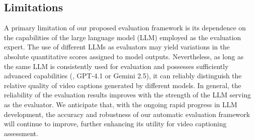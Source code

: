 \subsection{Limitations}\label{exp_app2}

A primary limitation of our proposed evaluation framework is its dependence on the capabilities of the large language model (LLM) employed as the evaluation expert. The use of different LLMs as evaluators may yield variations in the absolute quantitative scores assigned to model outputs. Nevertheless, as long as the same LLM is consistently used for evaluation and possesses sufficiently advanced capabilities (\eg, GPT-4.1 or Gemini 2.5), it can reliably distinguish the relative quality of video captions generated by different models. In general, the reliability of the evaluation results improves with the strength of the LLM serving as the evaluator. We anticipate that, with the ongoing rapid progress in LLM development, the accuracy and robustness of our automatic evaluation framework will continue to improve, further enhancing its utility for video captioning assessment.
